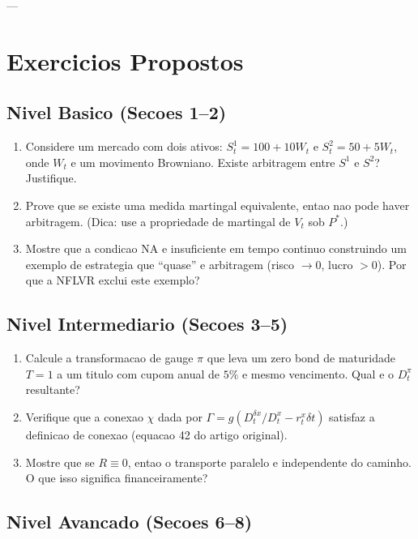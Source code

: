\documentclass[12pt,a4paper]{article}
\theoremstyle{remark}
\begin{document}
---

\section{Exercicios Propostos}

\subsection*{Nivel Basico (Secoes 1--2)}

\begin{enumerate}[nosep]
  \item Considere um mercado com dois ativos: $S^1_t = 100 + 10W_t$ e $S^2_t =
        50 + 5W_t$, onde $W_t$ e um movimento Browniano. Existe arbitragem
        entre $S^1$ e $S^2$? Justifique.
  \item Prove que se existe uma medida martingal equivalente, entao nao pode
        haver arbitragem. (Dica: use a propriedade de martingal de $V_t$ sob
        $P^*$.)
  \item Mostre que a condicao NA e insuficiente em tempo continuo construindo
        um exemplo de estrategia que ``quase'' e arbitragem (risco $\to 0$,
        lucro $> 0$). Por que a NFLVR exclui este exemplo?
\end{enumerate}

\subsection*{Nivel Intermediario (Secoes 3--5)}

\begin{enumerate}[nosep]
  \item Calcule a transformacao de gauge $\pi$ que leva um zero bond de
        maturidade $T=1$ a um titulo com cupom anual de $5\%$ e mesmo
        vencimento. Qual e o $D^\pi_t$ resultante?
  \item Verifique que a conexao $\chi$ dada por $\Gamma = g(D_t^{\delta x}/D_t^x
        - r_t^x\delta t)$ satisfaz a definicao de conexao (equacao 42 do artigo
        original).
  \item Mostre que se $R \equiv 0$, entao o transporte paralelo e independente
        do caminho. O que isso significa financeiramente?
\end{enumerate}

\subsection*{Nivel Avancado (Secoes 6--8)}
\end{document}
